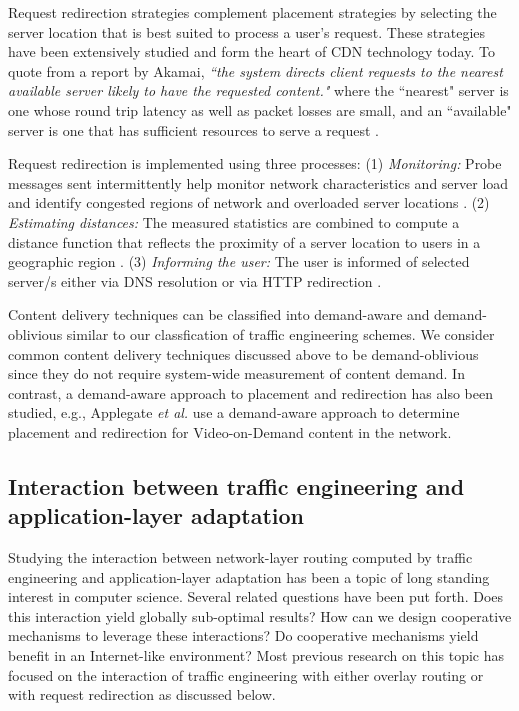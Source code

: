 Request redirection strategies complement placement strategies by selecting the server location that is best suited to process a user's request. These strategies have been extensively studied and form the heart of CDN technology today. To quote from a report by Akamai,  \emph{``the system directs client requests to the nearest available server likely to have the requested content."} where the ``nearest" server is one whose round trip latency as well as packet losses are small, and  an ``available" server is one that has sufficient resources to serve a request \cite{DilleyMPPSW02}. 

Request redirection is implemented using three processes: (1) \emph{Monitoring:} Probe messages sent intermittently help monitor network characteristics and server load and identify congested regions of network and overloaded server locations \cite{oasis,donar}. (2) \emph{Estimating distances:} The measured statistics are combined to compute a distance function that reflects the proximity of a server location to users in a geographic region \cite{donar}. (3) \emph{Informing the user:} The user is informed of selected server/s either via DNS resolution \cite{DilleyMPPSW02} or via HTTP redirection \cite{barbir2003known}.

Content delivery techniques can be classified into demand-aware and demand-oblivious similar to our classfication of traffic engineering schemes. We consider common content delivery techniques discussed above to be demand-oblivious since they do not require system-wide measurement of content demand. In contrast, a demand-aware approach to  placement and redirection has also been studied, e.g., Applegate \emph{et al.} use a demand-aware approach to determine placement and redirection for Video-on-Demand content in the network. 

\subsection{Interaction between traffic engineering and application-layer adaptation}
\label{sec:ch2-te-cdn}

Studying the interaction between network-layer routing computed by traffic engineering and application-layer adaptation has been a topic of long standing interest in computer science. Several related questions have been put forth. Does this interaction yield globally sub-optimal results? How can we design cooperative mechanisms to leverage these interactions? Do cooperative mechanisms yield benefit in an Internet-like environment? Most previous research on this topic has focused on the interaction of traffic engineering with either overlay routing \cite{Roughgarden,selfishQiu} or with request redirection \cite{Jiang2009,JohariGameTheory, CATE, P4P} as discussed below. 

